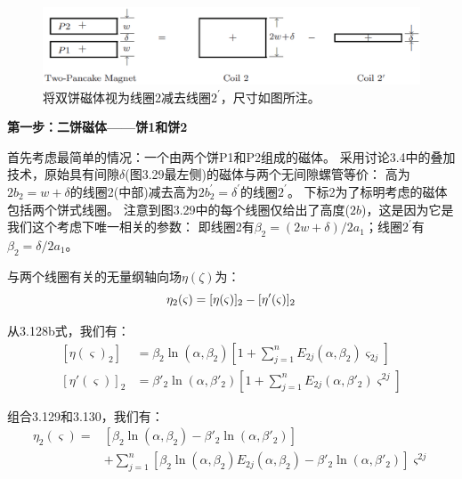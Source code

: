 \begin{figure}[htbp]
	\centering
	\includegraphics[scale=0.5]{chpt3/figs/fig3.29.eps}
	\caption{将双饼磁体视为线圈2减去线圈$2^\prime$，尺寸如图所注。}
\end{figure}

\textbf{第一步：二饼磁体——饼1和饼2}

首先考虑最简单的情况：一个由两个饼P1和P2组成的磁体。
采用讨论3.4中的叠加技术，原始具有间隙$\delta$(图3.29最左侧)的磁体与两个无间隙螺管等价：
高为$2b_2 = w +\delta$的线圈2(中部)减去高为$2b_2^\prime = \delta^\prime$的线圈$2^\prime$。
下标2为了标明考虑的磁体包括两个饼式线圈。
注意到图3.29中的每个线圈仅给出了高度($2b$)，这是因为它是我们这个考虑下唯一相关的参数：
即线圈2有$\beta_2=(2w+\delta)/2a_1$；线圈$2^\prime$有$\beta_2=\delta/2a_1$。

与两个线圈有关的无量纲轴向场$\eta(\zeta)$为：
\begin{equation}
\eta_{2}(\varsigma)=[\eta(\varsigma)]_{2}-[\eta'(\varsigma)]_{2}\\%
\end{equation}

从3.128b式，我们有：
\begin{subequations}
	\begin{align}
{[\eta(\varsigma)_{2}]}&=\beta_{2}\ln(\alpha,\beta_{2})\left[1+\sum_{j=1}^{n}E_{2j}(\alpha,\beta_{2})\varsigma_{2j}\right]\\
{[\eta'(\varsigma)]}_{2}&=\beta'_{2}\ln(\alpha,\beta'_{2})\left[1+\sum_{j=1}^{n}E_{2j}(\alpha,\beta'_{2})\varsigma^{2j}\right]%
	\end{align}
\end{subequations}

组合3.129和3.130，我们有：
\begin{equation}
\begin{split}
\eta_{2}(\varsigma)=&[\beta_{2}\ln(\alpha,\beta_{2})-\beta'_{2}\ln(\alpha,\beta'_{2})]\\
&+\sum_{j=1}^{n}[\beta_{2}\ln(\alpha,\beta_{2})E_{2j}(\alpha,\beta_{2})-\beta'_{2}\ln(\alpha,\beta'_{2})]\varsigma^{2j}%
\end{split}
\end{equation}

